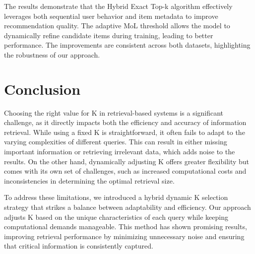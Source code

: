 \documentclass[Afour,sageh,times]{sagej}
\begin{document}
The results demonstrate that the Hybrid Exact Top-k algorithm effectively leverages both sequential user behavior and item metadata to improve recommendation quality. The adaptive MoL threshold allows the model to dynamically refine candidate items during training, leading to better performance. The improvements are consistent across both datasets, highlighting the robustness of our approach.\\
%	
%
%
%
\section{Conclusion}\label{sec13}

Choosing the right value for K in retrieval-based systems is a significant challenge, as it directly impacts both the efficiency and accuracy of information retrieval. While using a fixed K is straightforward, it often fails to adapt to the varying complexities of different queries. This can result in either missing important information or retrieving irrelevant data, which adds noise to the results. On the other hand, dynamically adjusting K offers greater flexibility but comes with its own set of challenges, such as increased computational costs and inconsistencies in determining the optimal retrieval size.

To address these limitations, we introduced a hybrid dynamic K selection strategy that strikes a balance between adaptability and efficiency. Our approach adjusts K based on the unique characteristics of each query while keeping computational demands manageable. This method has shown promising results, improving retrieval performance by minimizing unnecessary noise and ensuring that critical information is consistently captured.
\end{document}
